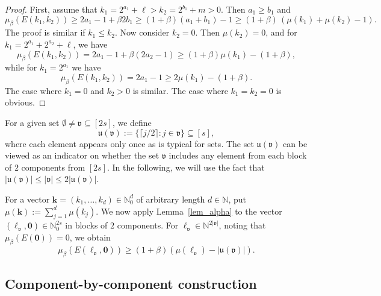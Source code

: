 \documentclass[namedate,webpdf,imanum]{ima-authoring-arxiv}%
\theoremstyle{thmstyletwo}%
\numberwithin{equation}{section}
\newcommand{\bsk}{\boldsymbol{k}}
\newcommand{\bsell}{\boldsymbol{\ell}}
\newcommand{\bszero}{\boldsymbol{0}}
\newcommand{\uu}{\mathfrak{u}}
\newcommand{\vv}{\mathfrak{v}}
\newcommand{\NN}{\mathbb{N}}
\begin{document}
\begin{proof}
First, assume that $k_1 = 2^{a_1} + \ell > k_2 = 2^{b_1}  + m > 0$. Then $a_1 \ge b_1$ and
\begin{equation*}
\mu_{\beta}(E(k_1, k_2)) \ge  2a_1 - 1 + \beta 2b_1 \ge (1+\beta) (a_1 + b_1) -1 \ge  (1+\beta)\, (\mu(k_1) + \mu(k_2) - 1).
\end{equation*}
The proof is similar if $k_1 \le k_2$. Now consider $k_2 = 0$. Then $\mu(k_2) = 0$, and for $k_1 = 2^{a_1} + 2^{a_2} + \ell$, we have
\begin{equation*}
\mu_{\beta}(E(k_1, k_2)) = 2a_1-1 + \beta (2a_2-1) \ge  (1+\beta) \mu(k_1) - (1+ \beta),
\end{equation*}
while for $k_1 = 2^{a_1}$ we have
\begin{equation*}
\mu_{\beta}(E(k_1, k_2)) = 2a_1-1 \ge 2 \mu(k_1) - (1 + \beta).
\end{equation*}
The case where $k_1 = 0$ and $k_2 > 0$ is similar. The case where $k_1=k_2 = 0$ is obvious.
\end{proof}




For a given set $\emptyset \neq \vv \subseteq [2 s]$, we define
\[
\uu(\vv) := \{\lceil j/2 \rceil : j \in \vv\} \subseteq [s], 
\]
where each element appears only once as is typical for sets. The set $\uu(\vv)$ can be viewed as an indicator on whether the set $\vv$ includes any element from each block of $2$ components from $[2 s]$. In the following, we will use the fact that $|\uu(\vv)| \le |\vv| \le 2|\uu(\vv)| $.


For a vector $\bsk=(k_1,\ldots,k_d) \in \NN_0^d$ of arbitrary length $d \in \NN$, put $\mu(\bsk):=\sum_{j=1}^d \mu(k_j)$. We now apply Lemma~\ref{lem_alpha} to the vector $(\bsell_{\vv}, \bszero) \in \NN_0^{2s}$ in blocks of $2$ components.
For $\bsell_{\vv} \in \mathbb{N}^{2|\vv|}$, noting that $\mu_{\beta}(E(\bszero)) = 0$, we obtain
\begin{equation}\label{est:mubbmu}
\mu_{\beta}(E(\bsell_\vv, \bszero)) \geq  (1 + \beta) (\mu(\bsell_\vv) - |\uu(\vv)|).
\end{equation}


\subsection{Component-by-component construction}
\end{document}
